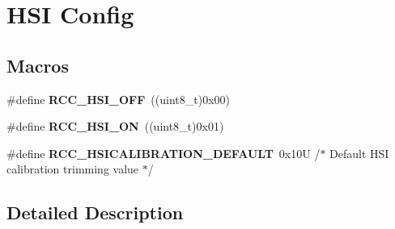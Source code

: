 \hypertarget{group___r_c_c___h_s_i___config}{}\section{H\+SI Config}
\label{group___r_c_c___h_s_i___config}
\subsection*{Macros}
\begin{DoxyCompactItemize}
\item 
\mbox{\label{group___r_c_c___h_s_i___config_ga1b34d37d3b51afec0758b3ddc7a7e665}} 
\#define {\bfseries R\+C\+C\+\_\+\+H\+S\+I\+\_\+\+O\+FF}~((uint8\+\_\+t)0x00)
\item 
\mbox{\label{group___r_c_c___h_s_i___config_ga0bf09ef9e46d5da25cced7b3122f92f5}} 
\#define {\bfseries R\+C\+C\+\_\+\+H\+S\+I\+\_\+\+ON}~((uint8\+\_\+t)0x01)
\item 
\mbox{\label{group___r_c_c___h_s_i___config_ga03cf582e263fb7e31a7783d8adabd7a0}} 
\#define {\bfseries R\+C\+C\+\_\+\+H\+S\+I\+C\+A\+L\+I\+B\+R\+A\+T\+I\+O\+N\+\_\+\+D\+E\+F\+A\+U\+LT}~0x10\+U         /$\ast$ Default H\+S\+I calibration trimming value $\ast$/
\end{DoxyCompactItemize}


\subsection{Detailed Description}
